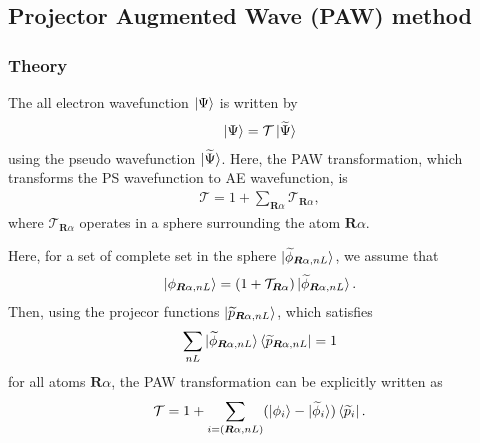 \documentclass{article}
\begin{document}
\subsection{Projector Augmented Wave (PAW) method}
\subsubsection{Theory}
The all electron wavefunction $\ket{\Psi}$ is written by 
\begin{align}
\ket{\Psi} = \mathcal{T} \ket{\widetilde{\Psi}}
\end{align}
using the pseudo wavefunction $\ket{\widetilde{\Psi}}$. Here, the PAW transformation, which transforms the PS wavefunction to AE wavefunction, is 
\begin{align}
  \mathcal{T} = 1 + \sum_{\bm{R}\alpha} \mathcal{T}_{\bm{R}\alpha},
\end{align}
where $\mathcal{T}_{\bm{R}\alpha}$ operates in a sphere surrounding the atom $\bm{R}\alpha$.

Here, for a set of complete set in the sphere $\ket{\widetilde{\phi}_{\bm{R}\alpha, nL}}$, we assume that 
\begin{align}
  \ket{{\phi}_{\bm{R}\alpha, nL}} = (1 + \mathcal{T}_{\bm{R}\alpha}) \ket{\widetilde{\phi}_{\bm{R}\alpha, nL}}.
\end{align}
Then, using the projecor functions $\ket{\widetilde{p}_{\bm{R}\alpha,nL}}$, which satisfies
\begin{align} 
  \sum_{nL} \ket{\widetilde{\phi}_{\bm{R}\alpha, nL}} \bra{\widetilde{p}_{\bm{R}\alpha, nL}} = 1
\end{align}
for all atoms $\bm{R}\alpha$, the PAW transformation can be explicitly written as 
\begin{align}
  \mathcal{T} = 1 + \sum_{i = (\bm{R}\alpha, nL)} (\ket{\phi_i} - \ket{\widetilde{\phi}_i}) \bra{\widetilde{p}_i}.
\end{align}
\end{document}
